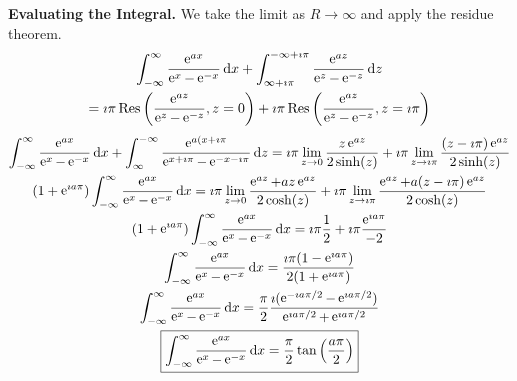 {\begin{Solution}
  \textbf{Evaluating the Integral.}
  We take the limit as $R \to \infty$ and apply the residue theorem.
  \begin{multline*}
    \int_{-\infty}^\infty \frac{ \e^{a x} }{ \e^x - \e^{-x} } \,\dd x
    + \int_{\infty + \imath \pi}^{-\infty + \imath \pi} 
    \frac{ \e^{a z} }{ \e^z - \e^{-z} } \,\dd z \\
    = \imath \pi \Res \left( \frac{ \e^{a z} }{ \e^z - \e^{-z} }, z = 0 \right)
    + \imath \pi \Res \left( \frac{ \e^{a z} }{ \e^z - \e^{-z} }, 
      z = \imath \pi \right) 
  \end{multline*}
  \begin{gather*}
    \int_{-\infty}^\infty \frac{ \e^{a x} }{ \e^x - \e^{-x} } \,\dd x
    + \int_\infty^{-\infty} 
    \frac{ \e^{a (x + \imath \pi} }{ \e^{x + \imath \pi} - \e^{-x - \imath \pi} } \,\dd z
    = \imath \pi \lim_{z \to 0} \frac{ z \e^{a z} }{ 2 \sinh(z) }
    + \imath \pi \lim_{z \to \imath \pi} 
    \frac{ (z - \imath \pi) \e^{a z} }{ 2 \sinh(z) } \\
    (1 + \e^{\imath a \pi} )\int_{-\infty}^\infty \frac{ \e^{a x} }{ \e^x - \e^{-x} } \,\dd x
    = \imath \pi \lim_{z \to 0} \frac{ \e^{a z} + a z \e^{a z} }{ 2 \cosh(z) }
    + \imath \pi \lim_{z \to \imath \pi} 
    \frac{ \e^{a z} + a (z - \imath \pi) \e^{a z} }{ 2 \cosh(z) } \\
    (1 + \e^{\imath a \pi} )\int_{-\infty}^\infty \frac{ \e^{a x} }{ \e^x - \e^{-x} } \,\dd x
    = \imath \pi \frac{ 1 }{ 2 }
    + \imath \pi \frac{ \e^{\imath a \pi} }{ - 2 } \\
    \int_{-\infty}^\infty \frac{ \e^{a x} }{ \e^x - \e^{-x} } \,\dd x
    = \frac{ \imath \pi (1 - \e^{\imath a \pi}) }{ 2 (1 + \e^{\imath a \pi}) } \\
    \int_{-\infty}^\infty \frac{ \e^{a x} }{ \e^x - \e^{-x} } \,\dd x
    = \frac{\pi}{2} \frac{ \imath (\e^{-\imath a \pi / 2} - \e^{\imath a \pi / 2}) }
    { \e^{\imath a \pi / 2} + \e^{\imath a \pi / 2} } \\
    \boxed{
      \int_{-\infty}^\infty \frac{ \e^{a x} }{ \e^x - \e^{-x} } \,\dd x
      = \frac{\pi}{2} \tan \left( \frac{a \pi}{2} \right)
      }
  \end{gather*}
\end{Solution}












}
